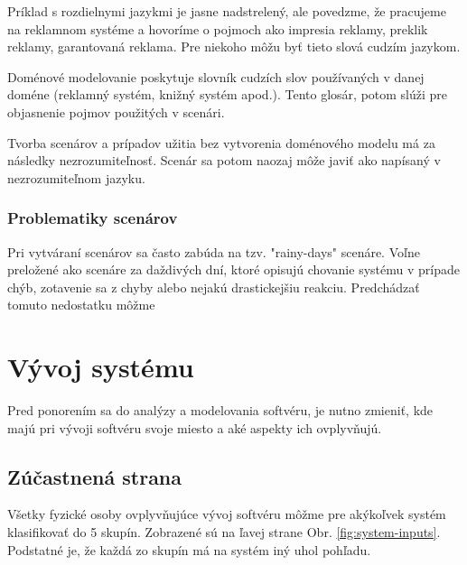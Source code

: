 Príklad s rozdielnymi jazykmi je jasne nadstrelený, ale
povedzme, že pracujeme na reklamnom systéme a hovoríme o pojmoch ako impresia reklamy, preklik reklamy, garantovaná reklama. Pre niekoho môžu byť tieto slová cudzím jazykom.

Doménové modelovanie poskytuje slovník cudzích slov používaných v danej doméne (reklamný systém, knižný systém apod.). Tento glosár, potom slúži pre objasnenie pojmov použitých v scenári.

Tvorba scenárov a prípadov užitia bez vytvorenia doménového modelu má za následky nezrozumiteľnosť. Scenár sa potom naozaj môže javiť ako napísaný v nezrozumiteľnom jazyku.

\subsubsection{Problematiky scenárov}

Pri vytváraní scenárov sa často zabúda na tzv. "rainy-days" scenáre. Voľne preložené ako scenáre za daždivých dní, ktoré opisujú chovanie systému v prípade chýb, zotavenie sa z chyby alebo nejakú drastickejšiu reakciu. Predchádzať tomuto nedostatku môžme 



\section{Vývoj systému}

Pred ponorením sa do analýzy a modelovania softvéru, je nutno zmieniť, kde majú pri vývoji softvéru svoje miesto a aké aspekty ich ovplyvňujú.

\subsection{Zúčastnená strana}

Všetky fyzické osoby ovplyvňujúce vývoj softvéru môžme pre akýkoľvek systém klasifikovať do 5 skupín. Zobrazené sú na ľavej strane Obr. \ref{fig:system-inputs}. Podstatné je, že každá zo skupín má na systém iný uhol pohľadu.


